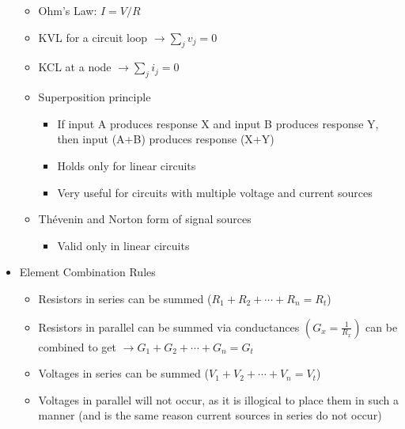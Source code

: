 \begin{itemize}
\begin{itemize}
      \item Ohm's Law: $I=V/R$

      \item KVL for a circuit loop $\to \sum_jv_j=0$

      \item KCL at a node $\to\sum_ji_j=0$

      \item Superposition principle

        \begin{itemize}

          \item If input A produces response X and input B produces response Y, then input (A+B) produces response (X+Y)

          \item Holds only for linear circuits

          \item Very useful for circuits with multiple voltage and current sources

        \end{itemize}

      \item Th\'evenin and Norton form of signal sources

        \begin{itemize}

          \item Valid only in linear circuits

        \end{itemize}

    \end{itemize}

  \item Element Combination Rules

    \begin{itemize}

      \item Resistors in series can be summed ($R_1+R_2+\cdots+R_n=R_t$)

      \item Resistors in parallel can be summed via conductances $\left( G_x=\frac{1}{R_x}\right)$ can be combined to get $\to G_1+G_2+\cdots+G_n=G_t$

      \item Voltages in series can be summed ($V_1+V_2+\cdots+V_n=V_t$)

      \item Voltages in parallel will not occur, as it is illogical to place them in such a manner (and is the same reason current sources in series do not occur)


\end{itemize}
\end{itemize}
